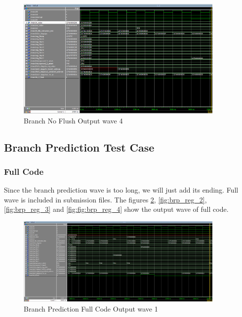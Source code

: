 \begin{figure}[H]
    \centering
    \includegraphics[width=0.9\textwidth]{images/test_cases/branch/Branch_no_flush_4.PNG}
    \caption{Branch No Flush Output wave 4}
    \label{fig:br_nop_4}
\end{figure}

\subsection{Branch Prediction Test Case}

\subsubsection{Full Code}
Since the branch prediction wave is too long, we will just add its ending. Full wave is included in submission files. The figures \ref{fig:brp_reg_1}, \ref{fig:brp_reg_2}, \ref{fig:brp_reg_3} and \ref{fig:fig:brp_reg_4} show the output wave of full code.

\begin{figure}[H]
    \centering
    \includegraphics[width=0.9\textwidth]{images/test_cases/branch_prediction/BranchPrediction_regular_20.PNG}
    \caption{Branch Prediction Full Code Output wave 1}
    \label{fig:brp_reg_1}
\end{figure}

